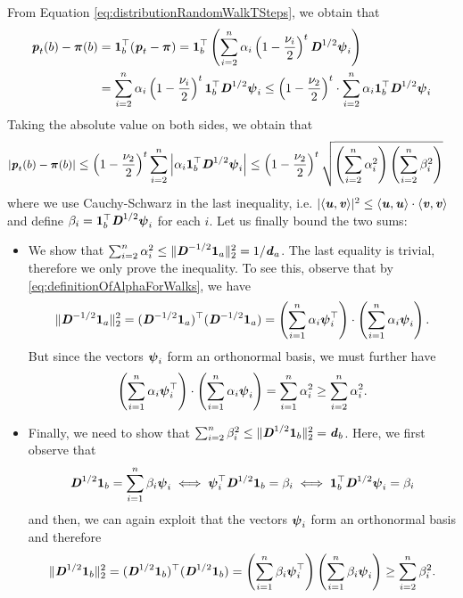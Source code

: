 From Equation \ref{eq:distributionRandomWalkTSteps}, we obtain that
\begin{align}\label{eq:piecewiseDistribution}
    \boldsymbol{\mathit{p}}_t(b) - \boldsymbol{\pi}(b) &= \boldsymbol{1}_b^\top(\boldsymbol{\mathit{p}}_t - \boldsymbol{\pi}) = \boldsymbol{1}_b^\top\left( \sum_{i=2}^n \alpha_i \left(1-\frac{\nu_i}{2}\right)^t \boldsymbol{\mathit{D}}^{1/2} \boldsymbol{\mathit{\psi}}_i \right)
    \\ & =   \sum_{i=2}^n \alpha_i \left(1-\frac{\nu_i}{2}\right)^t \boldsymbol{1}_b^\top\boldsymbol{\mathit{D}}^{1/2} \boldsymbol{\mathit{\psi}}_i
    \leq \left(1-\frac{\nu_2}{2}\right)^t \cdot \sum_{i=2}^n \alpha_i  \boldsymbol{1}_b^\top\boldsymbol{\mathit{D}}^{1/2} \boldsymbol{\mathit{\psi}}_i
\end{align}
Taking the absolute value on both sides, we obtain that
\begin{align*}\small
|\boldsymbol{\mathit{p}}_t(b) - \boldsymbol{\pi}(b)|
&\leq \left(1-\frac{\nu_2}{2}\right)^t\sum_{i=2}^n \left|\alpha_i  \boldsymbol{1}_b^\top\boldsymbol{\mathit{D}}^{1/2} \boldsymbol{\mathit{\psi}}_i \right|\leq \left(1-\frac{\nu_2}{2}\right)^t \sqrt{\left( \sum_{i=2}^n \alpha_i^2 \right) \left( \sum_{i=2}^n \beta_i^2 \right)}
\end{align*}
where we use Cauchy-Schwarz in the last inequality, i.e. $|\langle \boldsymbol{\mathit{u}}, \boldsymbol{\mathit{v}} \rangle|^2 \leq \langle \boldsymbol{\mathit{u}}, \boldsymbol{\mathit{u}} \rangle \cdot \langle \boldsymbol{\mathit{v}}, \boldsymbol{\mathit{v}} \rangle$ and define $\beta_i = \boldsymbol{1}_b^\top\boldsymbol{\mathit{D}}^{1/2} \boldsymbol{\mathit{\psi}}_i$ for each $i$. Let us finally bound the two sums:
\begin{itemize}
    \item We show that $\sum_{i=2}^n \alpha_i^2 \leq \|\boldsymbol{\mathit{D}}^{-1/2}\boldsymbol{1}_a\|_2^2 = 1/\boldsymbol{\mathit{d}}_a$. The last equality is trivial,  therefore we only prove the inequality. To see this, observe that by  \ref{eq:definitionOfAlphaForWalks}, we have
    \[
     \|\boldsymbol{\mathit{D}}^{-1/2}\boldsymbol{1}_a\|_2^2 = (\boldsymbol{\mathit{D}}^{-1/2} \boldsymbol{1}_a)^{\top} (\boldsymbol{\mathit{D}}^{-1/2} \boldsymbol{1}_a) = \left(\sum_{i = 1}^n \alpha_i \boldsymbol{\mathit{\psi}}_i^{\top}\right) \cdot \left(\sum_{i = 1}^n \alpha_i \boldsymbol{\mathit{\psi}}_i \right).
    \]
    But since the vectors $\boldsymbol{\mathit{\psi}}_i$ form an orthonormal basis, we must further have 
    \[
    		\left(\sum_{i = 1}^n \alpha_i \boldsymbol{\mathit{\psi}}_i^{\top}\right) \cdot \left(\sum_{i = 1}^n \alpha_i \boldsymbol{\mathit{\psi}}_i \right) = \sum_{i = 1}^n \alpha_i^2 \geq \sum_{i = 2}^n \alpha_i^2. 
    \]
    \item Finally, we need to show that $\sum_{i=2}^n \beta_i^2 \leq \|\boldsymbol{\mathit{D}}^{1/2}\boldsymbol{1}_b\|_2^2 = \boldsymbol{\mathit{d}}_b$.  Here, we first observe that 
    \[
        \boldsymbol{\mathit{D}}^{1/2}\boldsymbol{1}_b = \sum_{i=1}^n \beta_i \boldsymbol{\mathit{\psi}}_i \iff  \boldsymbol{\mathit{\psi}}_i^\top \boldsymbol{\mathit{D}}^{1/2}\boldsymbol{1}_b = \beta_i \iff  \boldsymbol{1}_b^\top \boldsymbol{\mathit{D}}^{1/2}\boldsymbol{\mathit{\psi}}_i= \beta_i  
    \]
    and then, we can again exploit that the vectors $\boldsymbol{\mathit{\psi}}_i$ form an orthonormal basis and therefore 
    \[
    \|\boldsymbol{\mathit{D}}^{1/2}\boldsymbol{1}_b\|_2^2 = (\boldsymbol{\mathit{D}}^{1/2}\boldsymbol{1}_b)^{\top} (\boldsymbol{\mathit{D}}^{1/2}\boldsymbol{1}_b) = \left(\sum_{i=1}^n \beta_i \boldsymbol{\mathit{\psi}}_i^\top\right) \left(\sum_{i=1}^n \beta_i \boldsymbol{\mathit{\psi}}_i\right) \geq \sum_{i=2}^n \beta_i^2.
    \]
\end{itemize}

